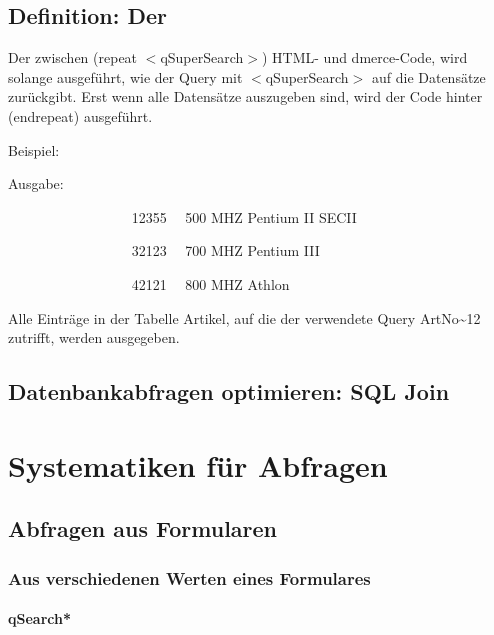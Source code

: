 \subsection{Definition: Der }

Der zwischen (repeat $<$qSuperSearch$>$) HTML- und dmerce-Code, wird
solange ausgef\"uhrt, wie der Query mit $<$qSuperSearch$>$ auf die
Datens\"atze zur\"uckgibt. Erst wenn alle Datens\"atze auszugeben
sind, wird der Code hinter (endrepeat) ausgef\"uhrt.

\medskip

Beispiel:


\medskip

Ausgabe:

\bigskip

~~~~~~~~~~~~~~~~~ 12355~~ 500 MHZ Pentium II SECII

~~~~~~~~~~~~~~~~~ 32123~~ 700 MHZ Pentium III

~~~~~~~~~~~~~~~~~ 42121~~ 800 MHZ Athlon

\bigskip

Alle Eintr\"age in der Tabelle Artikel, auf die der verwendete Query
ArtNo\textasciitilde{}12 zutrifft, werden ausgegeben.

\subsection{Datenbankabfragen optimieren: SQL Join}

\section{Systematiken f\"ur Abfragen}

\subsection{Abfragen aus Formularen}
\subsubsection{Aus verschiedenen Werten eines Formulares}
\paragraph{qSearch{*}}

